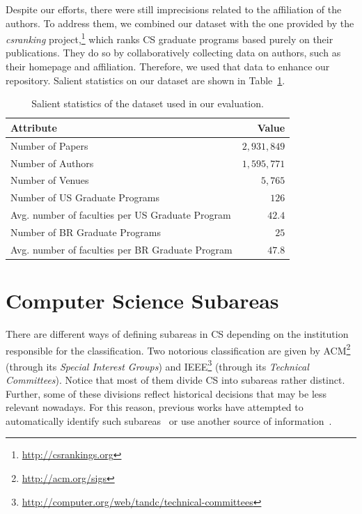 \documentclass[msc]{ppgccufmg}
\begin{document}
Despite our efforts, there were still imprecisions related to the affiliation of the authors. To address them, we combined our dataset with the one provided by the \textit{csranking} project,\footnote{\url{http://csrankings.org}} which ranks CS graduate programs based purely on their publications. They do so by collaboratively collecting data on authors, such as their homepage and affiliation. Therefore, we used that data to enhance our repository. Salient statistics on our dataset are shown in Table~\ref{tab:stats}.

\begin{table}[htbp]
\centering
\caption{Salient statistics of the dataset used in our evaluation.}
\label{tab:stats}
\begin{tabular}{l|r}
\toprule
Attribute & Value \\ \hline
Number of Papers         & $2{,}931{,}849$                 \\
Number of Authors        & $1{,}595{,}771$                 \\
Number of Venues         & $5{,}765$                     \\
Number of US Graduate Programs         & $126$                       \\
Avg. number of faculties per US Graduate Program    &    $42.4$                              \\ %
Number of BR Graduate Programs          & $25$                        \\
Avg. number of faculties per BR Graduate Program    &    $47.8$                              \\ %
\bottomrule
\end{tabular}
\end{table}

\section{Computer Science Subareas}

There are different ways of defining subareas in CS depending on the institution responsible for the classification. Two notorious classification are given by ACM\footnote{\url{http://acm.org/sigs}} (through its \textit{Special Interest Groups}) and IEEE\footnote{\url{http://computer.org/web/tandc/technical-committees}} (through its \textit{Technical Committees}). 
%
Notice that most of them divide CS into subareas rather distinct. Further, some of these divisions reflect historical decisions that may be less relevant nowadays. For this reason, previous works have attempted to automatically identify such subareas~\citep{wainer13} or use another source of information~\citep{hoonlor13}.
\end{document}
